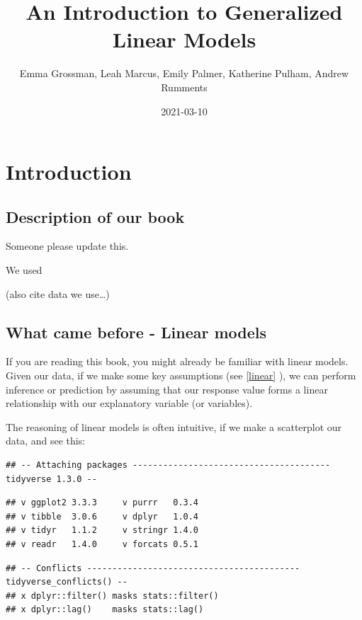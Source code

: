 \documentclass[
]{book}
\title{An Introduction to Generalized Linear Models}
\author{Emma Grossman, Leah Marcus, Emily Palmer, Katherine Pulham, Andrew Rumments}
\date{2021-03-10}
\begin{document}
\maketitle

{
\setcounter{tocdepth}{1}
\tableofcontents
}
\hypertarget{intro}{%
\chapter{Introduction}\label{intro}}

\hypertarget{description-of-our-book}{%
\section{Description of our book}\label{description-of-our-book}}

Someone please update this.

We used \citep{dunn2018generalized}

(also cite data we use\ldots)

\hypertarget{what-came-before---linear-models}{%
\section{What came before - Linear models}\label{what-came-before---linear-models}}

If you are reading this book, you might already be familiar with linear models. Given our data, if we make some key assumptions (see \ref{linear} ), we can perform inference or prediction by assuming that our response value forms a linear relationship with our explanatory variable (or variables).

The reasoning of linear models is often intuitive, if we make a scatterplot our data, and see this:

\begin{verbatim}
## -- Attaching packages --------------------------------------- tidyverse 1.3.0 --
\end{verbatim}

\begin{verbatim}
## v ggplot2 3.3.3     v purrr   0.3.4
## v tibble  3.0.6     v dplyr   1.0.4
## v tidyr   1.1.2     v stringr 1.4.0
## v readr   1.4.0     v forcats 0.5.1
\end{verbatim}

\begin{verbatim}
## -- Conflicts ------------------------------------------ tidyverse_conflicts() --
## x dplyr::filter() masks stats::filter()
## x dplyr::lag()    masks stats::lag()
\end{verbatim}
\end{document}
